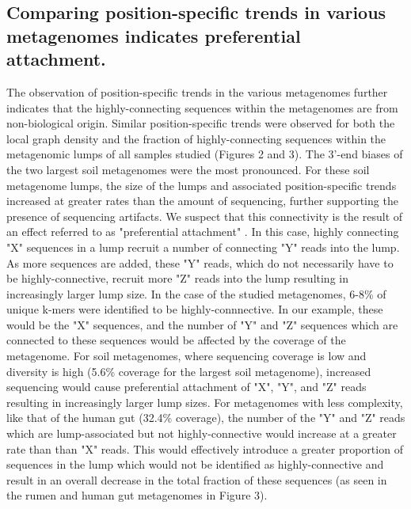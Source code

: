 \documentclass[11pt]{article} %
\begin{document}
\subsection{Comparing position-specific trends in various metagenomes indicates preferential attachment.}
The observation of position-specific trends in the various metagenomes further indicates that the highly-connecting sequences within the metagenomes are from non-biological origin.  Similar position-specific trends were observed for both the local graph density and the fraction of highly-connecting sequences within the metagenomic lumps of all samples studied (Figures 2 and 3).  The 3'-end biases of the two largest soil metagenomes were the most pronounced.  For these soil metagenome lumps, the size of the lumps and associated position-specific trends increased at greater rates than the amount of sequencing, further supporting the presence of sequencing artifacts.  We suspect that this connectivity is the result of an effect referred to as "preferential attachment" \cite{Barabasi:1999p1083}. In this case, highly connecting "X" sequences in a lump recruit a number of connecting "Y" reads into the lump.  As more sequences are added, these "Y" reads, which do not necessarily have to be highly-connective, recruit more "Z" reads into the lump resulting in increasingly larger lump size.  In the case of the studied metagenomes, 6-8\% of unique k-mers were identified to be highly-connnective.  In our example, these would be the "X" sequences, and the number of "Y" and "Z" sequences which are connected to these sequences would be affected by the coverage of the metagenome.  For soil metagenomes, where sequencing coverage is low and diversity is high (5.6\% coverage for the largest soil metagenome), increased sequencing would cause preferential attachment of "X", "Y", and "Z" reads resulting in increasingly larger lump sizes.  For metagenomes with less complexity, like that of the human gut (32.4\% coverage), the number of the "Y" and "Z" reads which are lump-associated but not highly-connective would increase at a greater rate than than "X" reads.   This would effectively introduce a greater proportion of sequences in the lump which would not be identified as highly-connective and result in an overall decrease in the total fraction of these sequences (as seen in the rumen and human gut metagenomes in Figure 3).  
\end{document}
